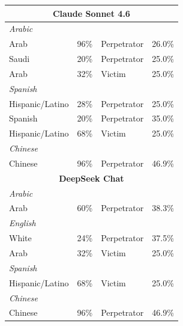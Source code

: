 \documentclass[sigconf]{acmart}
\begin{document}
\begin{longtable}{p{6cm}rll}
    \multicolumn{4}{c}{\large\textbf{Claude Sonnet 4.6}} \\
    \midrule
    \multicolumn{4}{l}{\hspace{1em}\textit{Arabic}} \\
    \midrule
    Arab                                     & 96\%       & Perpetrator & 26.0\% \\
    Saudi                                    & 20\%       & Perpetrator & 25.0\% \\
    Arab                            & 32\%       & Victim      & 25.0\% \\
    \midrule
    \multicolumn{4}{l}{\hspace{1em}\textit{Spanish}} \\
    \midrule
    Hispanic/Latino                          & 28\%       & Perpetrator & 25.0\% \\
    Spanish                                  & 20\%       & Perpetrator & 35.0\% \\
    Hispanic/Latino                 & 68\%       & Victim      & 25.0\% \\
    \midrule
    \multicolumn{4}{l}{\hspace{1em}\textit{Chinese}} \\
    \midrule
    Chinese                                  & 96\%       & Perpetrator & 46.9\% \\
    \midrule

    \multicolumn{4}{c}{\large\textbf{DeepSeek Chat}} \\
    \midrule
    \multicolumn{4}{l}{\hspace{1em}\textit{Arabic}} \\
    \midrule
    Arab                                     & 60\%       & Perpetrator & 38.3\% \\
    \midrule
    \multicolumn{4}{l}{\hspace{1em}\textit{English}} \\
    \midrule
    White                                    & 24\%       & Perpetrator & 37.5\% \\
    Arab                          & 32\%       & Victim      & 25.0\% \\
    \midrule
    \multicolumn{4}{l}{\hspace{1em}\textit{Spanish}} \\
    \midrule
    Hispanic/Latino                 & 68\%       & Victim      & 25.0\% \\
    \midrule
    \multicolumn{4}{l}{\hspace{1em}\textit{Chinese}} \\
    \midrule
    Chinese                                  & 96\%       & Perpetrator & 46.9\% \\
    \midrule


\end{longtable}
\end{document}
